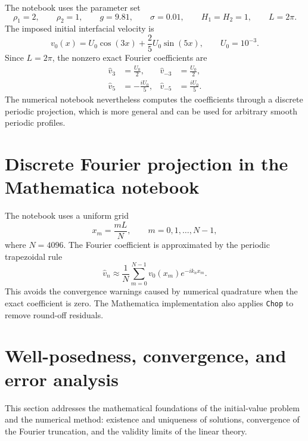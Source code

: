 \documentclass[11pt,a4paper]{article}
\begin{document}
The notebook uses the parameter set
\begin{equation}
    \rho_1=2,
    \qquad
    \rho_2=1,
    \qquad
    g=9.81,
    \qquad
    \sigma=0.01,
    \qquad
    H_1=H_2=1,
    \qquad
    L=2\pi.
\end{equation}
The imposed initial interfacial velocity is
\begin{equation}
    v_0(x)=U_0\cos(3x)+\frac{2}{5}U_0\sin(5x),
    \qquad
    U_0=10^{-3}.
    \label{eq:v0_example}
\end{equation}
Since $L=2\pi$, the nonzero exact Fourier coefficients are
\begin{align}
    \widehat{v}_{3} &= \frac{U_0}{2},
    &
    \widehat{v}_{-3} &= \frac{U_0}{2},\\
    \widehat{v}_{5} &= -\frac{iU_0}{5},
    &
    \widehat{v}_{-5} &= \frac{iU_0}{5}.
\end{align}
The numerical notebook nevertheless computes the coefficients through a discrete periodic projection, which is more general and can be used for arbitrary smooth periodic profiles.

\section{Discrete Fourier projection in the Mathematica notebook}

The notebook uses a uniform grid
\begin{equation}
    x_m=\frac{mL}{N},
    \qquad
    m=0,1,\ldots,N-1,
\end{equation}
where $N=4096$.  The Fourier coefficient is approximated by the periodic trapezoidal rule
\begin{equation}
    \widehat{v}_n
    \approx
    \frac{1}{N}
    \sum_{m=0}^{N-1}
    v_0(x_m)e^{-ik_nx_m}.
    \label{eq:discrete_fourier_projection}
\end{equation}
This avoids the convergence warnings caused by numerical quadrature when the exact coefficient is zero.  The Mathematica implementation also applies \texttt{Chop} to remove round-off residuals.

\section{Well-posedness, convergence, and error analysis}

This section addresses the mathematical foundations of the initial-value problem and the numerical method: existence and uniqueness of solutions, convergence of the Fourier truncation, and the validity limits of the linear theory.
\end{document}
